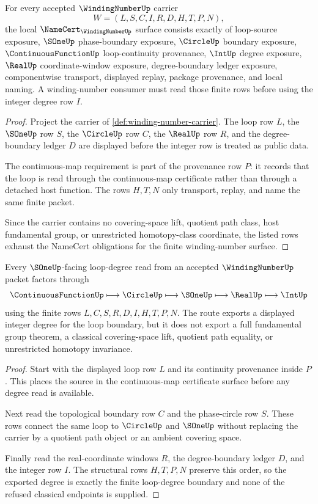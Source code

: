 \begin{theorem}
\label{thm:winding-number-namecert-obligations}
For every accepted $\WindingNumberUp$ carrier
$$
W=(L,S,C,I,R,D,H,T,P,N),
$$
the local $\NameCert_{\WindingNumberUp}$ surface consists exactly of loop-source exposure, $\SOneUp$ phase-boundary exposure, $\CircleUp$ boundary exposure, $\ContinuousFunctionUp$ loop-continuity provenance, $\IntUp$ degree exposure, $\RealUp$ coordinate-window exposure, degree-boundary ledger exposure, componentwise transport, displayed replay, package provenance, and local naming. A winding-number consumer must read those finite rows before using the integer degree row $I$.
\end{theorem}
\begin{proof}
Project the carrier of \autoref{def:winding-number-carrier}. The loop row $L$, the $\SOneUp$ row $S$, the $\CircleUp$ row $C$, the $\RealUp$ row $R$, and the degree-boundary ledger $D$ are displayed before the integer row is treated as public data.

The continuous-map requirement is part of the provenance row $P$: it records that the loop is read through the continuous-map certificate rather than through a detached host function. The rows $H,T,N$ only transport, replay, and name the same finite packet.

Since the carrier contains no covering-space lift, quotient path class, host fundamental group, or unrestricted homotopy-class coordinate, the listed rows exhaust the NameCert obligations for the finite winding-number surface.
\end{proof}

\begin{theorem}
\label{thm:winding-number-s1-loop-degree-boundary}
Every $\SOneUp$-facing loop-degree read from an accepted $\WindingNumberUp$ packet factors through
$$
\ContinuousFunctionUp \longmapsto \CircleUp \longmapsto \SOneUp \longmapsto \RealUp \longmapsto \IntUp
$$
using the finite rows $L,C,S,R,D,I,H,T,P,N$. The route exports a displayed integer degree for the loop boundary, but it does not export a full fundamental group theorem, a classical covering-space lift, quotient path equality, or unrestricted homotopy invariance.
\end{theorem}
\begin{proof}
Start with the displayed loop row $L$ and its continuity provenance inside $P$. This places the source in the continuous-map certificate surface before any degree read is available.

Next read the topological boundary row $C$ and the phase-circle row $S$. These rows connect the same loop to $\CircleUp$ and $\SOneUp$ without replacing the carrier by a quotient path object or an ambient covering space.

Finally read the real-coordinate windows $R$, the degree-boundary ledger $D$, and the integer row $I$. The structural rows $H,T,P,N$ preserve this order, so the exported degree is exactly the finite loop-degree boundary and none of the refused classical endpoints is supplied.
\end{proof}

